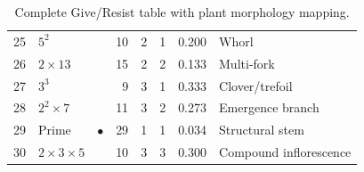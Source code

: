 \documentclass[11pt,a4paper]{article}
\begin{document}
\begin{table}[H]
\begin{tabular}{rllrrrrl}
25 & $5^2$ & & 10 & 2 & 1 & 0.200 & Whorl \\
26 & $2\times13$ & & 15 & 2 & 2 & 0.133 & Multi-fork \\
27 & $3^3$ & & 9 & 3 & 1 & 0.333 & Clover/trefoil \\
28 & $2^2\times7$ & & 11 & 3 & 2 & 0.273 & Emergence branch \\
29 & Prime & $\bullet$ & 29 & 1 & 1 & 0.034 & Structural stem \\
30 & $2\times3\times5$ & & 10 & 3 & 3 & 0.300 & Compound inflorescence \\
\bottomrule
\end{tabular}
\caption{Complete Give/Resist table with plant morphology mapping.}
\label{tab:full}
\end{table}
\end{document}
